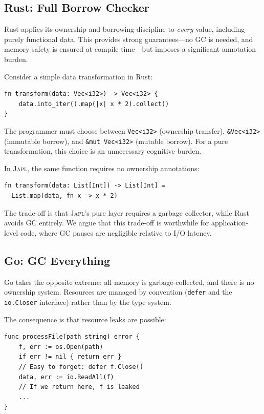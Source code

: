\documentclass[11pt]{article}
\newcommand{\JAPL}{\textsc{Japl}}
\begin{document}
\subsection{Rust: Full Borrow Checker}\label{sec:cmp-rust}

Rust applies its ownership and borrowing discipline to \emph{every}
value, including purely functional data.  This provides strong
guarantees---no GC is needed, and memory safety is ensured at compile
time---but imposes a significant annotation burden.

Consider a simple data transformation in Rust:

\begin{verbatim}
fn transform(data: Vec<i32>) -> Vec<i32> {
    data.into_iter().map(|x| x * 2).collect()
}
\end{verbatim}

The programmer must choose between \texttt{Vec<i32>} (ownership
transfer), \texttt{\&Vec<i32>} (immutable borrow), and
\texttt{\&mut Vec<i32>} (mutable borrow).  For a pure transformation,
this choice is an unnecessary cognitive burden.

In \JAPL{}, the same function requires no ownership annotations:

\begin{lstlisting}[caption={\JAPL{} vs.\ Rust: pure data transformation}]
fn transform(data: List[Int]) -> List[Int] =
  List.map(data, fn x -> x * 2)
\end{lstlisting}

The trade-off is that \JAPL{}'s pure layer requires a garbage
collector, while Rust avoids GC entirely.  We argue that this
trade-off is worthwhile for application-level code, where GC pauses
are negligible relative to I/O latency.

\subsection{Go: GC Everything}\label{sec:cmp-go}

Go takes the opposite extreme: all memory is garbage-collected, and
there is no ownership system.  Resources are managed by convention
(\texttt{defer} and the \texttt{io.Closer} interface) rather than by
the type system.

The consequence is that resource leaks are possible:

\begin{verbatim}
func processFile(path string) error {
    f, err := os.Open(path)
    if err != nil { return err }
    // Easy to forget: defer f.Close()
    data, err := io.ReadAll(f)
    // If we return here, f is leaked
    ...
}
\end{verbatim}
\end{document}

